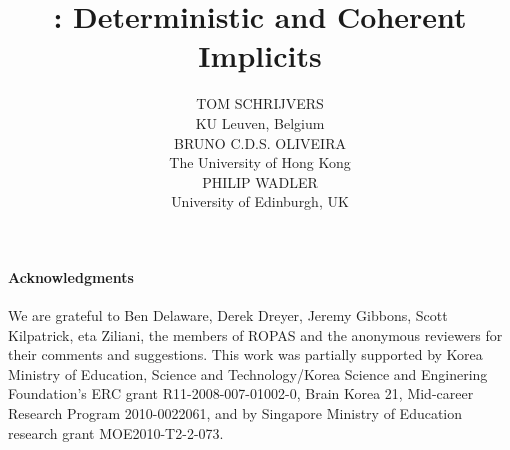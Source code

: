 \documentclass{jfp1}
\title[Cochis: Deterministic and Coherent Implicits]{\name: Deterministic and Coherent Implicits}
\author[T. Schrijvers, B. Oliveira and P. Wadler]
       {TOM SCHRIJVERS \\
        KU Leuven, Belgium \\
        BRUNO C.D.S. OLIVEIRA \\
        The University of Hong Kong \\
        PHILIP WADLER \\ 
        University of Edinburgh, UK
}
\begin{document}
\maketitle

\begin{abstract}

\end{abstract}












%






\paragraph{Acknowledgments}
We are grateful to Ben Delaware, Derek Dreyer, Jeremy Gibbons, Scott
Kilpatrick, eta Ziliani, the members of ROPAS and the
anonymous reviewers for their comments and suggestions.  This work was
partially supported by Korea Ministry of Education, Science and
Technology/Korea Science and Enginering Foundation's ERC grant
R11-2008-007-01002-0, Brain Korea 21, Mid-career Research Program 2010-0022061, and
by Singapore Ministry of Education research grant MOE2010-T2-2-073.

\newpage


\newpage
\appendix




\end{document}

